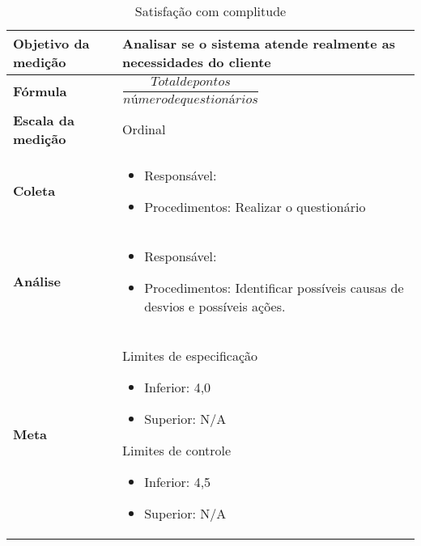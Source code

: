 \begin{table}[H]
\centering
\begin{tabular}{|p{4cm}|p{5cm}|}
\hline
	\textbf{Objetivo da medição} &
	Analisar se o sistema atende realmente as necessidades do cliente
	\\ \hline
	\textbf{Fórmula} &
	$\dfrac{Total de pontos}{número de questionários}$
	\\ \hline
	\textbf{Escala da medição} &
	Ordinal
	\\ \hline
	\textbf{Coleta} &
	\begin{itemize}
		\item Responsável: \fabio
		\item Procedimentos: Realizar o questionário
	\end{itemize}
	\\ \hline
	\textbf{Análise} &
	\begin{itemize}
		\item Responsável: \stefania
		\item Procedimentos: Identificar possíveis causas de desvios e possíveis ações.
	\end{itemize}
	\\ \hline
  \textbf{Meta} &
	Limites de especificação
		\begin{itemize}
			\item Inferior: 4,0
			\item Superior: N/A
		\end{itemize}
	Limites de controle
		\begin{itemize}
			\item Inferior: 4,5
			\item Superior: N/A
		\end{itemize}
  \\ \hline
\end{tabular}
\caption{Satisfação com complitude}
\label{tab:satisfacao_complitude}
\end{table}

